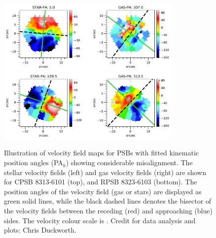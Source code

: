 \begin{figure}
    \centering
    \includegraphics[width=0.8\textwidth]{images/PAplots/PAplotsCPSB/8313-6101-PA.pdf}
    \includegraphics[width=0.8\textwidth]{images/PAplots/PAplotsRPSB/8323-6103-PA.pdf}
    \caption[Examples of PSBs showing significant kinematic PA misalignment $\Delta$PA$_{k}$]{Illustration of velocity field maps for PSBs with fitted kinematic position angles (PA$_{k}$) showing considerable misalignment. The stellar velocity fields (left) and gas velocity fields (right) are shown for CPSB 8313-6101 (top), and RPSB 8323-6103 (bottom). The position angles of the velocity field (gas or stars) are displayed as green solid lines, while the black dashed lines denotes the bisector of the velocity fields between the receding (red) and approaching (blue) sides. The velocity colour scale is \kms. Credit for data analysis and plots: Chris Duckworth.}
    \label{fig:CPSB-8313-6101-PA}
\end{figure}


